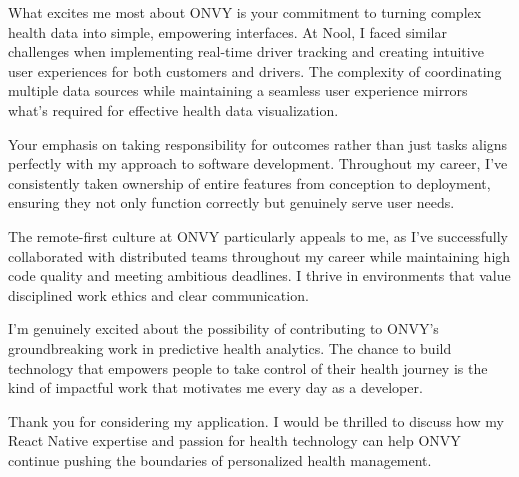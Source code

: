 \documentclass[11pt,a4paper,roman]{moderncv}        %
\begin{document}
What excites me most about ONVY is your commitment to turning complex health data into simple, empowering interfaces. At Nool, I faced similar challenges when implementing real-time driver tracking and creating intuitive user experiences for both customers and drivers. The complexity of coordinating multiple data sources while maintaining a seamless user experience mirrors what's required for effective health data visualization.

Your emphasis on taking responsibility for outcomes rather than just tasks aligns perfectly with my approach to software development. Throughout my career, I've consistently taken ownership of entire features from conception to deployment, ensuring they not only function correctly but genuinely serve user needs.

The remote-first culture at ONVY particularly appeals to me, as I've successfully collaborated with distributed teams throughout my career while maintaining high code quality and meeting ambitious deadlines. I thrive in environments that value disciplined work ethics and clear communication.

I'm genuinely excited about the possibility of contributing to ONVY's groundbreaking work in predictive health analytics. The chance to build technology that empowers people to take control of their health journey is the kind of impactful work that motivates me every day as a developer.

Thank you for considering my application. I would be thrilled to discuss how my React Native expertise and passion for health technology can help ONVY continue pushing the boundaries of personalized health management.

\makeletterclosing
\end{document}
